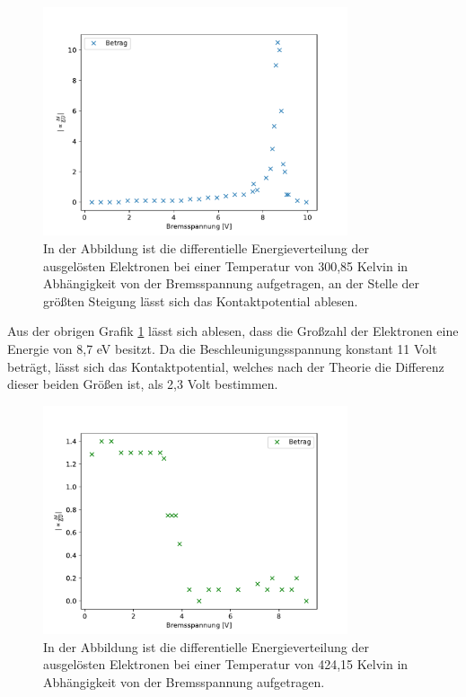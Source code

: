 \documentclass[titlepage = firstcover]{scrartcl}
\begin{document}
                \begin{figure}[h]
                  \centering
                  \includegraphics[width = 0.8\textwidth]{Steigung1.pdf}
                  \caption{In der Abbildung ist die differentielle Energieverteilung der ausgelösten Elektronen bei einer Temperatur von 300,85 Kelvin in Abhängigkeit von der Bremsspannung aufgetragen, an der Stelle der größten Steigung lässt sich das Kontaktpotential ablesen.}
                  \label{fig:Steigung300}
                \end{figure}

            \FloatBarrier

            \noindent

            Aus der obrigen Grafik \ref{fig:Steigung300} lässt sich ablesen, dass die Großzahl der Elektronen eine Energie von 8,7 eV besitzt. Da die Beschleunigungsspannung konstant 11 Volt beträgt,
            lässt sich das Kontaktpotential, welches nach der Theorie die Differenz dieser beiden Größen ist, als 2,3 Volt bestimmen.

            \FloatBarrier

                \begin{figure}[h]
                  \centering
                  \includegraphics[width = 0.8\textwidth]{Steigung2.pdf}
                  \caption{In der Abbildung ist die differentielle Energieverteilung der ausgelösten Elektronen bei einer Temperatur von 424,15 Kelvin in Abhängigkeit von der Bremsspannung aufgetragen.}
                  \label{fig:Steigung424}
                \end{figure}
\end{document}

